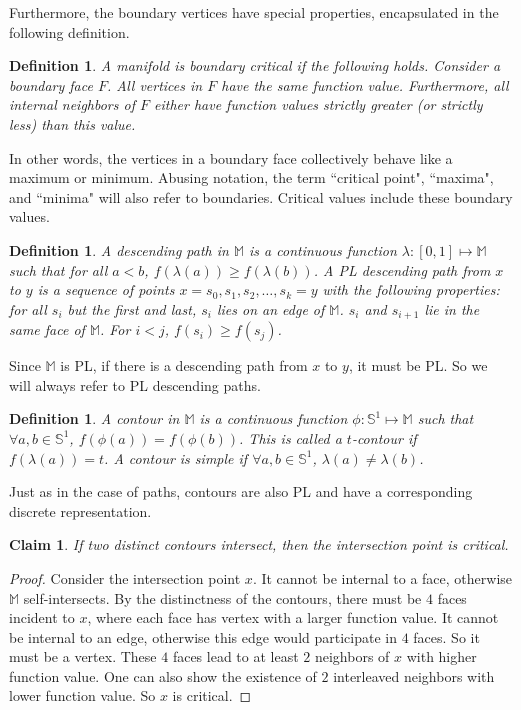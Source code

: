 \documentclass[11pt]{article}
\newtheorem{claim}[theorem]{Claim}
\newtheorem{definition}[theorem]{Definition}
\theoremstyle{definition}
\newcommand{\MM}{\mathbb{M}}
\newcommand{\SSS}{\mathbb{S}}
\begin{document}
Furthermore, the boundary vertices have special properties, encapsulated in the following definition.

\begin{definition} \label{def:bound} A manifold is \emph{boundary critical} if the following holds.
Consider a boundary face $F$. All vertices in $F$ have the same function value. Furthermore, all
internal neighbors of $F$ either have function values strictly greater (or strictly less)
than this value.
\end{definition}

In other words, the vertices in a boundary face collectively behave like a maximum or minimum. 
Abusing notation, the term ``critical point", ``maxima", and ``minima" will also refer to boundaries.
Critical values include these boundary values.

\begin{definition} \label{def:desc} A \emph{descending path} in $\MM$ is a continuous function $\lambda:[0,1] \mapsto \MM$
such that for all $a < b$, $f(\lambda(a)) \geq f(\lambda(b))$. A \emph{PL descending path} from $x$ to $y$ is a sequence
of points $x = s_0, s_1, s_2, \ldots, s_k = y$ with the following properties: for all $s_i$ but the first and last,
$s_i$ lies on an edge of $\MM$. $s_i$ and $s_{i+1}$ lie in the same face of $\MM$. 
For $i < j$, $f(s_i) \geq f(s_j)$.
\end{definition}

Since $\MM$ is PL, if there is a descending path from $x$ to $y$, it must be PL. So we will always refer to
PL descending paths.

\begin{definition} \label{def:cont} A \emph{contour} in $\MM$ is a continuous function $\phi:\SSS^1 \mapsto \MM$
such that $\forall a, b \in \SSS^1$, $f(\phi(a)) = f(\phi(b))$. This is called a \emph{$t$-contour} if $f(\lambda(a)) = t$.
A contour is \emph{simple} if $\forall a, b \in \SSS^1$, $\lambda(a) \neq \lambda(b)$. 
\end{definition}

Just as in the case of paths, contours are also PL and have a corresponding discrete representation.

\begin{claim} \label{clm:cont} If two distinct contours intersect, then the intersection point
is critical.
\end{claim} 

\begin{proof} Consider the intersection point $x$. It cannot be internal to a face, otherwise $\MM$ self-intersects.
By the distinctness of the contours, there must be $4$ faces incident to $x$, where each face
has vertex with a larger function value.
It cannot be internal to an edge, otherwise this edge would participate in $4$ faces. So it must be a vertex. 
These $4$ faces lead to at least $2$ neighbors of $x$ with higher function value. One can also show the existence of $2$
interleaved neighbors with lower function value. So $x$ is critical.
\end{proof}
\end{document}
